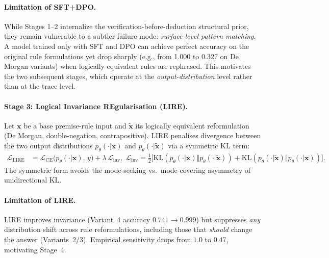 \documentclass{article} %
\begin{document}
\paragraph{Limitation of SFT+DPO.}
While Stages 1--2 internalize the verification-before-deduction structural prior, they remain vulnerable to a subtler failure mode: \textit{surface-level pattern matching}. A model trained only with SFT and DPO can achieve perfect accuracy on the original rule formulations yet drop sharply (e.g., from 1.000 to 0.327 on De Morgan variants) when logically equivalent rules are rephrased. This motivates the two subsequent stages, which operate at the \emph{output-distribution} level rather than at the trace level.

\paragraph{Stage 3: Logical Invariance REgularisation (LIRE).}
Let $\mathbf{x}$ be a base premise-rule input and $\tilde{\mathbf{x}}$ its logically equivalent reformulation (De Morgan, double-negation, contrapositive). LIRE penalises divergence between the two output distributions $p_\theta(\cdot|\mathbf{x})$ and $p_\theta(\cdot|\tilde{\mathbf{x}})$ via a symmetric KL term:
\begin{align}
\mathcal{L}_{\mathrm{LIRE}} &= \mathcal{L}_{\mathrm{CE}}\bigl(p_\theta(\cdot|\mathbf{x}),\, y\bigr) + \lambda\,\mathcal{L}_{\mathrm{inv}},\;
\mathcal{L}_{\mathrm{inv}} = \tfrac{1}{2}\bigl[\mathrm{KL}(p_\theta(\cdot|\mathbf{x})\Vert p_\theta(\cdot|\tilde{\mathbf{x}})) + \mathrm{KL}(p_\theta(\cdot|\tilde{\mathbf{x}})\Vert p_\theta(\cdot|\mathbf{x}))\bigr].
\label{eq:lire}
\end{align}
\label{eq:symkl}%
The symmetric form avoids the mode-seeking vs.\ mode-covering asymmetry of unidirectional KL.

\paragraph{Limitation of LIRE.}
LIRE improves invariance (Variant~4 accuracy $0.741 \to 0.999$) but suppresses \emph{any} distribution shift across rule reformulations, including those that \emph{should} change the answer (Variants~2/3). Empirical sensitivity drops from $1.0$ to $0.47$, motivating Stage~4.
\end{document}
